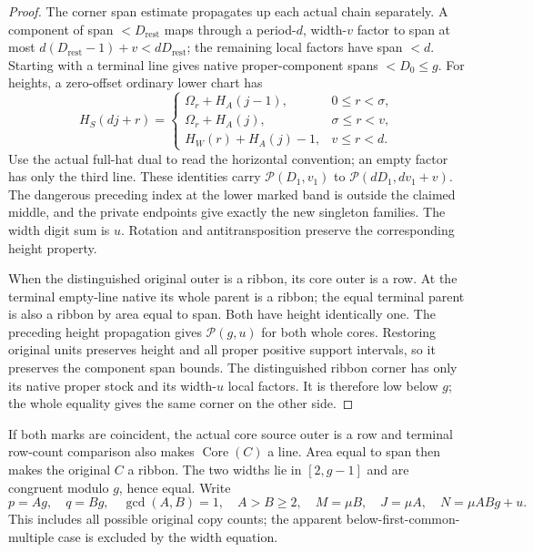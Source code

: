 \documentclass[11pt,a4paper]{amsart}
\numberwithin{equation}{section}
\theoremstyle{plain}
\theoremstyle{definition}
\newcommand{\Core}{\operatorname{Core}}
\begin{document}
\begin{proof}
The corner span estimate propagates up each actual chain separately.
A component of span \(<D_{\mathrm{rest}}\) maps through a period-\(d\), width-\(v\)
factor to span at most \(d(D_{\mathrm{rest}}-1)+v<dD_{\mathrm{rest}}\); the remaining
local factors have span \(<d\).  Starting with a terminal line gives native
proper-component spans \(<D_0\le g\).
For heights, a zero-offset ordinary lower chart has
\[
 H_S(dj+r)=
 \begin{cases}
 \Omega_r+H_A(j-1),&0\le r<\sigma,\\
 \Omega_r+H_A(j),&\sigma\le r<v,\\
 H_W(r)+H_A(j)-1,&v\le r<d.
 \end{cases}
\]
Use the actual full-hat dual to read the horizontal convention; an empty
factor has only the third line.  These identities carry \(\mathcal P(D_1,v_1)\) to
\(\mathcal P(dD_1,dv_1+v)\).  The dangerous preceding index at the lower marked band
is outside the claimed middle, and the private endpoints give exactly
the new singleton families.  The width digit sum is \(u\).  Rotation and
antitransposition preserve the corresponding height property.

When the distinguished original outer is a ribbon, its core outer is a
row.  At the terminal empty-line native its whole parent is a ribbon;
the equal terminal parent is also a ribbon by area equal to span.
Both have height identically one.  The preceding height propagation gives
\(\mathcal P(g,u)\) for both whole cores.  Restoring original units preserves height
and all proper positive support intervals, so it preserves the component
span bounds.  The distinguished ribbon corner has only its native proper
stock and its width-\(u\) local factors.  It is therefore low below \(g\);
the whole equality gives the same corner on the other side.
\end{proof}

If both marks are coincident, the actual core source outer is a row and
terminal row-count comparison also makes \(\Core(C)\) a line.  Area equal
to span then makes the original \(C\) a ribbon.  The two widths lie in
\([2,g-1]\) and are congruent modulo \(g\), hence equal.  Write
\begin{equation}\label{eq:two-coincident-counts}
 p=Ag,\quad q=Bg,\quad \gcd(A,B)=1,\quad A>B\ge2,
 \quad M=\mu B,\quad J=\mu A,\quad N=\mu ABg+u.
\end{equation}
This includes all possible original copy counts; the apparent
below-first-common-multiple case is excluded by the width equation.
\end{document}
